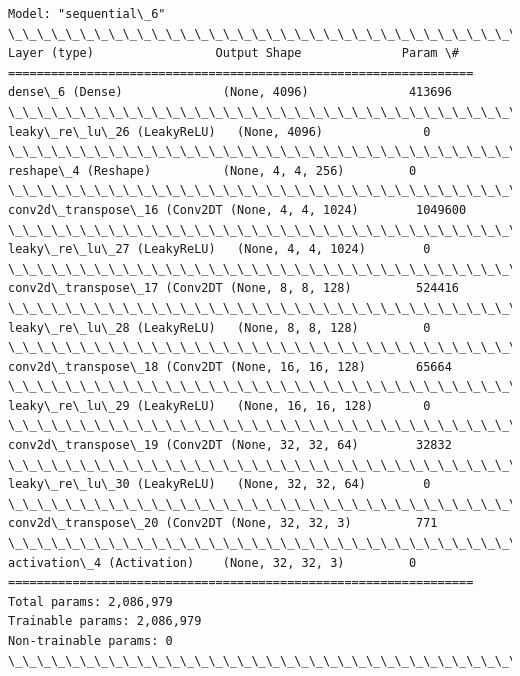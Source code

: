 \documentclass[11pt]{article}
\begin{document}
    \begin{Verbatim}[commandchars=\\\{\}]
Model: "sequential\_6"
\_\_\_\_\_\_\_\_\_\_\_\_\_\_\_\_\_\_\_\_\_\_\_\_\_\_\_\_\_\_\_\_\_\_\_\_\_\_\_\_\_\_\_\_\_\_\_\_\_\_\_\_\_\_\_\_\_\_\_\_\_\_\_\_\_
Layer (type)                 Output Shape              Param \#   
=================================================================
dense\_6 (Dense)              (None, 4096)              413696    
\_\_\_\_\_\_\_\_\_\_\_\_\_\_\_\_\_\_\_\_\_\_\_\_\_\_\_\_\_\_\_\_\_\_\_\_\_\_\_\_\_\_\_\_\_\_\_\_\_\_\_\_\_\_\_\_\_\_\_\_\_\_\_\_\_
leaky\_re\_lu\_26 (LeakyReLU)   (None, 4096)              0         
\_\_\_\_\_\_\_\_\_\_\_\_\_\_\_\_\_\_\_\_\_\_\_\_\_\_\_\_\_\_\_\_\_\_\_\_\_\_\_\_\_\_\_\_\_\_\_\_\_\_\_\_\_\_\_\_\_\_\_\_\_\_\_\_\_
reshape\_4 (Reshape)          (None, 4, 4, 256)         0         
\_\_\_\_\_\_\_\_\_\_\_\_\_\_\_\_\_\_\_\_\_\_\_\_\_\_\_\_\_\_\_\_\_\_\_\_\_\_\_\_\_\_\_\_\_\_\_\_\_\_\_\_\_\_\_\_\_\_\_\_\_\_\_\_\_
conv2d\_transpose\_16 (Conv2DT (None, 4, 4, 1024)        1049600   
\_\_\_\_\_\_\_\_\_\_\_\_\_\_\_\_\_\_\_\_\_\_\_\_\_\_\_\_\_\_\_\_\_\_\_\_\_\_\_\_\_\_\_\_\_\_\_\_\_\_\_\_\_\_\_\_\_\_\_\_\_\_\_\_\_
leaky\_re\_lu\_27 (LeakyReLU)   (None, 4, 4, 1024)        0         
\_\_\_\_\_\_\_\_\_\_\_\_\_\_\_\_\_\_\_\_\_\_\_\_\_\_\_\_\_\_\_\_\_\_\_\_\_\_\_\_\_\_\_\_\_\_\_\_\_\_\_\_\_\_\_\_\_\_\_\_\_\_\_\_\_
conv2d\_transpose\_17 (Conv2DT (None, 8, 8, 128)         524416    
\_\_\_\_\_\_\_\_\_\_\_\_\_\_\_\_\_\_\_\_\_\_\_\_\_\_\_\_\_\_\_\_\_\_\_\_\_\_\_\_\_\_\_\_\_\_\_\_\_\_\_\_\_\_\_\_\_\_\_\_\_\_\_\_\_
leaky\_re\_lu\_28 (LeakyReLU)   (None, 8, 8, 128)         0         
\_\_\_\_\_\_\_\_\_\_\_\_\_\_\_\_\_\_\_\_\_\_\_\_\_\_\_\_\_\_\_\_\_\_\_\_\_\_\_\_\_\_\_\_\_\_\_\_\_\_\_\_\_\_\_\_\_\_\_\_\_\_\_\_\_
conv2d\_transpose\_18 (Conv2DT (None, 16, 16, 128)       65664     
\_\_\_\_\_\_\_\_\_\_\_\_\_\_\_\_\_\_\_\_\_\_\_\_\_\_\_\_\_\_\_\_\_\_\_\_\_\_\_\_\_\_\_\_\_\_\_\_\_\_\_\_\_\_\_\_\_\_\_\_\_\_\_\_\_
leaky\_re\_lu\_29 (LeakyReLU)   (None, 16, 16, 128)       0         
\_\_\_\_\_\_\_\_\_\_\_\_\_\_\_\_\_\_\_\_\_\_\_\_\_\_\_\_\_\_\_\_\_\_\_\_\_\_\_\_\_\_\_\_\_\_\_\_\_\_\_\_\_\_\_\_\_\_\_\_\_\_\_\_\_
conv2d\_transpose\_19 (Conv2DT (None, 32, 32, 64)        32832     
\_\_\_\_\_\_\_\_\_\_\_\_\_\_\_\_\_\_\_\_\_\_\_\_\_\_\_\_\_\_\_\_\_\_\_\_\_\_\_\_\_\_\_\_\_\_\_\_\_\_\_\_\_\_\_\_\_\_\_\_\_\_\_\_\_
leaky\_re\_lu\_30 (LeakyReLU)   (None, 32, 32, 64)        0         
\_\_\_\_\_\_\_\_\_\_\_\_\_\_\_\_\_\_\_\_\_\_\_\_\_\_\_\_\_\_\_\_\_\_\_\_\_\_\_\_\_\_\_\_\_\_\_\_\_\_\_\_\_\_\_\_\_\_\_\_\_\_\_\_\_
conv2d\_transpose\_20 (Conv2DT (None, 32, 32, 3)         771       
\_\_\_\_\_\_\_\_\_\_\_\_\_\_\_\_\_\_\_\_\_\_\_\_\_\_\_\_\_\_\_\_\_\_\_\_\_\_\_\_\_\_\_\_\_\_\_\_\_\_\_\_\_\_\_\_\_\_\_\_\_\_\_\_\_
activation\_4 (Activation)    (None, 32, 32, 3)         0         
=================================================================
Total params: 2,086,979
Trainable params: 2,086,979
Non-trainable params: 0
\_\_\_\_\_\_\_\_\_\_\_\_\_\_\_\_\_\_\_\_\_\_\_\_\_\_\_\_\_\_\_\_\_\_\_\_\_\_\_\_\_\_\_\_\_\_\_\_\_\_\_\_\_\_\_\_\_\_\_\_\_\_\_\_\_

    \end{Verbatim}
\end{document}
